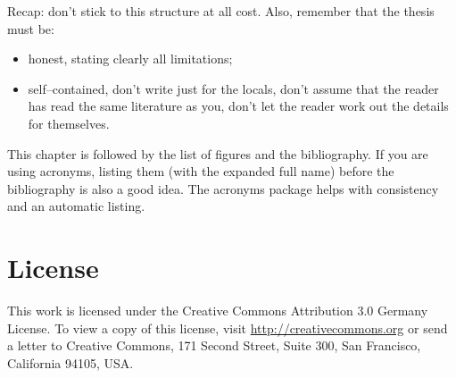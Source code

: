 \documentclass[a4paper,twoside, openright,12pt]{report}
\begin{document}
\vspace{\baselineskip}
Recap: don't stick to this structure at all cost. Also, remember that the thesis must be:

\begin{itemize}
	\item honest, stating clearly all limitations;
	\item self--contained, don't write just for the locals, don't assume that the reader has read the same literature as you, don't let the reader work out the details for themselves.
\end{itemize}



This chapter is followed by the list of figures and the bibliography. If you are using acronyms, listing them (with the expanded full name) before the bibliography is also a good idea. The acronyms package helps with consistency and an automatic listing.




\cleardoublepage
{} 
\listoffigures 	 %


\cleardoublepage
{}




\cleardoublepage
\chapter*{License}
This work is licensed under the Creative Commons Attribution 3.0 Germany
License. To view a copy of this license,
visit \href{http://creativecommons.org/licenses/by/3.0/de/}{http://creativecommons.org} or send a letter
to Creative Commons, 171 Second Street, Suite 300, San
Francisco, California 94105, USA.
\end{document}
